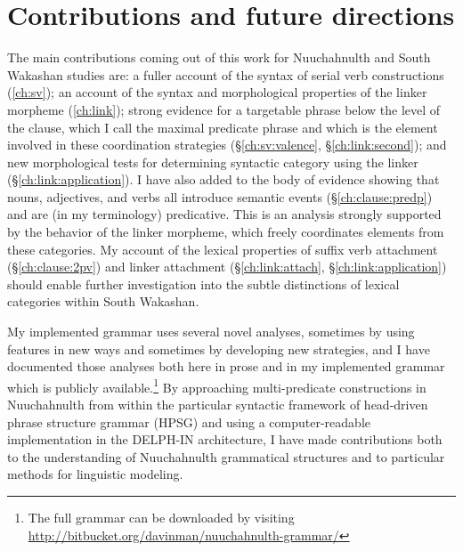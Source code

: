 \section{Contributions and future directions}

The main contributions coming out of this work for Nuuchahnulth and South Wakashan studies are: a fuller account of the syntax of serial verb constructions (\cref{ch:sv}); an account of the syntax and morphological properties of the linker morpheme (\cref{ch:link}); strong evidence for a targetable phrase below the level of the clause, which I call the maximal predicate phrase and which is the element involved in these coordination strategies (\S\ref{ch:sv:valence}, \S\ref{ch:link:second}); and new morphological tests for determining syntactic category using the linker (\S\ref{ch:link:application}). I have also added to the body of evidence showing that nouns, adjectives, and verbs all introduce semantic events (\S\ref{ch:clause:predp}) and are (in my terminology) predicative. This is an analysis strongly supported by the behavior of the linker morpheme, which freely coordinates elements from these categories. My account of the lexical properties of suffix verb attachment (\S\ref{ch:clause:2pv}) and linker attachment (\S\ref{ch:link:attach}, \S\ref{ch:link:application}) should enable further investigation into the subtle distinctions of lexical categories within South Wakashan.

My implemented grammar uses several novel analyses, sometimes by using features in new ways and sometimes by developing new strategies, and I have documented those analyses both here in prose and in my implemented grammar which is publicly available.\footnote{The full grammar can be downloaded by visiting \url{http://bitbucket.org/davinman/nuuchahnulth-grammar/}} By approaching multi-predicate constructions in Nuuchahnulth from within the particular syntactic framework of head-driven phrase structure grammar (HPSG) and using a computer-readable implementation in the DELPH-IN architecture, I have made contributions both to the understanding of Nuuchahnulth grammatical structures and to particular methods for linguistic modeling.


